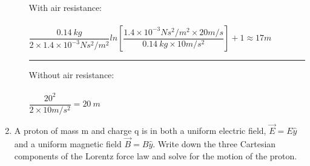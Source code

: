 \documentclass[fleqn]{article}
\begin{document}
\begin{enumerate}
\begin{enumerate}
        \textcolor{hwColor}{
          With air resistance: \\ \\
          $
            \dfrac{0.14 ~ kg}{2 \times 1.4 × 10^{-3}Ns^2/m^2} ln \left[\dfrac{1.4 × 10^{-3}Ns^2/m^2 \times 20 m/s}{0.14 ~ kg \times 10 m/s^2}\right]+1 \approx 17 m
          $
        }

        \textcolor{hwColor}{
          \rule{15cm}{1pt}
        }
      
        \textcolor{hwColor}{
          Without air resistance: \\ \\
          $
            \dfrac{20^2}{2 \times 10 m/s^2}=20 ~ m
          $
        }

    \end{enumerate}

    \item  A proton of mass m and charge q is in both a uniform electric field,
    $\overrightarrow{E}=E\hat{y}$ and a uniform magnetic field $\overrightarrow{B}=B\hat{y}$. Write down the three
    Cartesian components of the Lorentz force law and solve for the motion of the proton.

  \end{enumerate}
\end{document}
